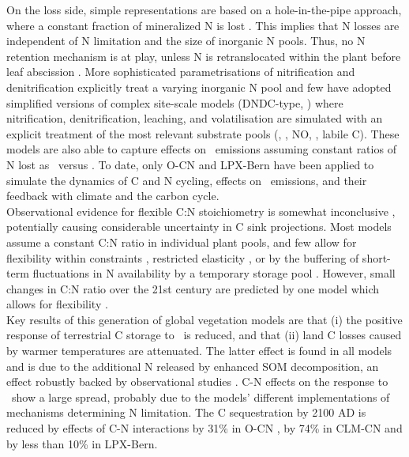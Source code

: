 On the loss side, simple representations are based on a hole-in-the-pipe approach, where a constant fraction of mineralized N is lost \citep{gerber10, wang10}. This implies that N losses are independent of N limitation and the size of inorganic N pools. Thus, no N retention mechanism is at play, unless N is retranslocated within the plant before leaf abscission \citep{fisher10}. More sophisticated parametrisations of nitrification and denitrification explicitly treat a varying inorganic N pool \citep{thornton07} and few \citep{zaehle10ocn1, xuri08gcb} have adopted simplified versions of complex site-scale models (DNDC-type, \citet{li00}) where nitrification, denitrification, leaching, and volatilisation are simulated with an explicit treatment of the most relevant substrate pools (\nooo , \noo , NO, \nhhh , labile C). These models are also able to capture effects on \nno\ emissions assuming constant ratios of N lost as \nno\ versus \nn . To date, only O-CN \citep{zaehle10ocn1} and LPX-Bern \citep{stocker13natcc} have been applied to simulate the dynamics of C and N cycling, effects on \nno\ emissions, and their feedback with climate and the carbon cycle. \\

Observational evidence for flexible C:N stoichiometry is somewhat inconclusive \citep{norby01, finzi07, norby05}, potentially causing considerable uncertainty in C sink projections. Most models assume a constant C:N ratio in individual plant pools, and few allow for flexibility within constraints \citep{xuri08gcb}, restricted elasticity \citep{zaehle10ocn1}, or by the buffering of short-term fluctuations in N availability by a temporary storage pool \citep{gerber10}. However, small changes in C:N ratio over the 21st century are predicted by one model which allows for flexibility \citep{esser11}.\\

Key results of this generation of global vegetation models are that (i) the positive response of terrestrial C storage to \coo\ is reduced, and that (ii) land C losses caused by warmer temperatures are attenuated. The latter effect is found in all models and is due to the additional N released by enhanced SOM decomposition, an effect robustly backed by observational studies \citep{melillo11}. C-N effects on the response to \coo\ show a large spread, probably due to the models' different implementations of mechanisms determining N limitation. The C sequestration by 2100 AD is reduced by effects of C-N interactions by 31\% in O-CN \citep{zaehle13}, by 74\% in CLM-CN \citep{thornton07} and by less than 10\% in LPX-Bern. 


